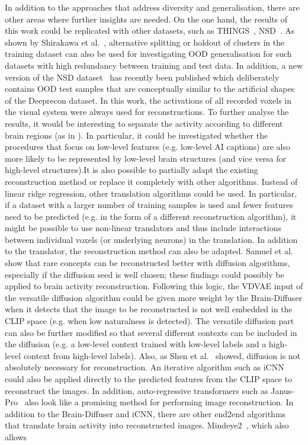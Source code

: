 In addition to the approaches that  address diversity and generalisation, there are other areas where further insights are needed. On the one hand, the results of this work could be replicated with other datasets, such as THINGS~\cite{hebartTHINGSdataMultimodalCollection2023}, NSD~\cite{allenMassive7TFMRI2022}. As shown by Shirakawa et al.~\cite{shirakawaSpuriousReconstructionBrain2024}, alternative splitting or holdout of clusters in the training dataset can also be used for investigating OOD generalisation for such datasets with high redundancy between training and test data. In addition, a new version of the NSD dataset~\cite{gifford7TFMRIDataset2025} has recently been published which deliberately contains OOD test samples that are conceptually similar to the artificial shapes of the Deeprecon dataset. In this work, the activations of all recorded voxels in the visual system were always used for reconstructions. To further analyse the results, it would be interesting to separate the activity according to different brain regions (as in \cite{horikawaGenericDecodingSeen2017}). In particular, it could be investigated whether the procedures that focus on low-level features (e.g. low-level AI captions) are also more likely to be represented by low-level brain structures (and vice versa for high-level structures).It is also possible to partially adapt the existing reconstruction method or replace it completely with other algorithms. Instead of linear ridge regression, other translation algorithms could be used. In particular, if a dataset with a larger number of training samples is used and fewer features need to be predicted (e.g. in the form of a different reconstruction algorithm), it might be possible to use non-linear translators and thus include interactions between individual voxels (or underlying neurons) in the translation. In addition to the translator, the reconstruction method can also be adapted. Samuel et al.~\cite{samuelGeneratingImagesRare2024} show that rare concepts can be reconstructed better with diffusion algorithms, especially if the diffusion seed is well chosen; these findings could possibly be applied to brain activity reconstruction. Following this logic, the VDVAE input of the versatile diffusion algorithm could be given more weight by the Brain-Diffuser when it detects that the image to be reconstructed is not well embedded in the CLIP space (e.g. when low naturalness is detected). The versatile diffusion part can also be further modified so that several different contexts can be included in the diffusion (e.g. a low-level context trained with low-level labels and a high-level context from high-level labels). Also, as Shen et al.~\cite{shenDeepImageReconstruction2019} showed, diffusion is not absolutely necessary for reconstruction. An iterative algorithm such as iCNN could also be applied directly to the predicted features from the CLIP space to reconstruct the images. In addition, auto-regressive transformers such as Janus-Pro~\cite{chenJanusproUnifiedMultimodal2025} also look like a promising method for performing image reconstruction. In addition to the Brain-Diffuser and iCNN, there are other end2end algorithms that translate brain activity into reconstructed images. Mindeye2~\cite{scottiMindEye2SharedSubjectModels2024}, which also allows 